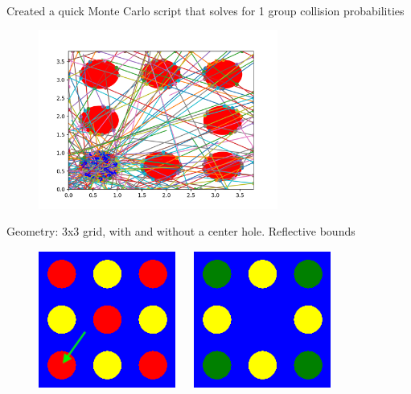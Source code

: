 \documentclass[10pt]{article}
\begin{document}
\newpage





~\newpage




  Created a quick Monte Carlo script that solves for 1 group collision probabilities 
\begin{figure}
\includegraphics[width=0.7\textwidth]{collisionProb1}
\end{figure}
  Geometry: 3x3 grid, with and without a center hole. Reflective bounds


\begin{figure}
\includegraphics[width=0.4\textwidth]{full_3x3}
  ~\quad~
\includegraphics[width=0.4\textwidth]{hole_3x3}
\end{figure}
\end{document}
